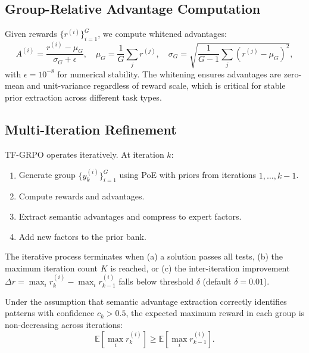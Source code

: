 \subsection{Group-Relative Advantage Computation}

Given rewards $\{r^{(i)}\}_{i=1}^G$, we compute whitened advantages:
\begin{equation}
    A^{(i)} = \frac{r^{(i)} - \mu_G}{\sigma_G + \epsilon},
    \quad \mu_G = \frac{1}{G}\sum_j r^{(j)},
    \quad \sigma_G = \sqrt{\frac{1}{G-1}\sum_j (r^{(j)} - \mu_G)^2},
\end{equation}
with $\epsilon = 10^{-8}$ for numerical stability. The whitening ensures
advantages are zero-mean and unit-variance regardless of reward scale, which is
critical for stable prior extraction across different task types.

\subsection{Multi-Iteration Refinement}

TF-GRPO operates iteratively. At iteration $k$:
\begin{enumerate}[leftmargin=1.5em]
    \item Generate group $\{y^{(i)}_k\}_{i=1}^G$ using PoE with priors from
          iterations $1, \ldots, k-1$.
    \item Compute rewards and advantages.
    \item Extract semantic advantages and compress to expert factors.
    \item Add new factors to the prior bank.
\end{enumerate}

The iterative process terminates when (a) a solution passes all tests, (b) the
maximum iteration count $K$ is reached, or (c) the inter-iteration improvement
$\Delta r = \max_i r_k^{(i)} - \max_i r_{k-1}^{(i)}$ falls below threshold
$\delta$ (default $\delta = 0.01$).

\begin{proposition}
\label{prop:monotonic}
Under the assumption that semantic advantage extraction correctly identifies
patterns with confidence $c_k > 0.5$, the expected maximum reward in each group
is non-decreasing across iterations:
\begin{equation}
    \mathbb{E}\left[\max_i r_k^{(i)}\right] \geq \mathbb{E}\left[\max_i r_{k-1}^{(i)}\right].
\end{equation}
\end{proposition}

